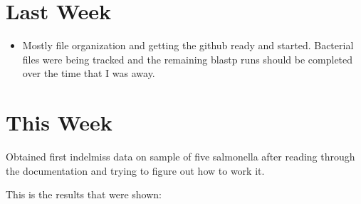 \documentclass[12pt]{article}
\begin{document}
\bigskip	
	
\section*{Last Week}

\begin{itemize} 

\item Mostly file organization and getting the github ready and started. Bacterial 
files were being tracked and the remaining blastp runs should be completed over the
time that I was away. 

\end{itemize}

\section*{This Week}
Obtained first indelmiss data on sample of five salmonella after reading through the 
documentation and trying to figure out how to work it.

This is the results that were shown:
\end{document}
